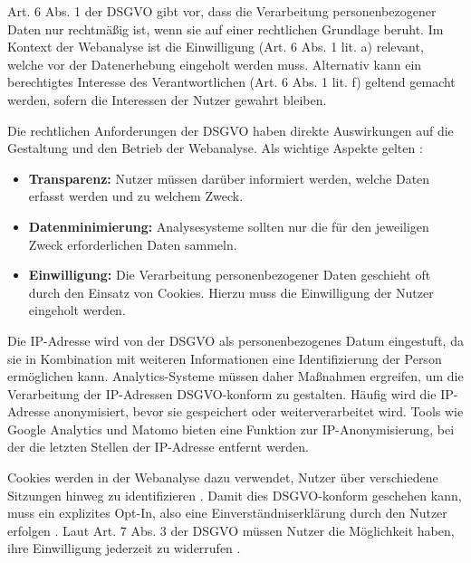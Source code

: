 Art. 6 Abs. 1 der DSGVO gibt vor, dass die Verarbeitung personenbezogener Daten nur rechtmäßig ist, wenn sie auf einer rechtlichen Grundlage beruht. Im Kontext der Webanalyse ist die Einwilligung (Art. 6 Abs. 1 lit. a) relevant, welche vor der Datenerhebung eingeholt werden muss. Alternativ kann ein berechtigtes Interesse des Verantwortlichen (Art. 6 Abs. 1 lit. f) geltend gemacht werden, sofern die Interessen der Nutzer gewahrt bleiben. \parencite{DSGVO}

Die rechtlichen Anforderungen der DSGVO haben direkte Auswirkungen auf die Gestaltung und den Betrieb der Webanalyse. Als wichtige Aspekte gelten \parencite[Kap.2.4]{Hanschke2020}:

\begin{itemize}
    \item \textbf{Transparenz:} Nutzer müssen darüber informiert werden, welche Daten erfasst werden und zu welchem Zweck.
    \item \textbf{Datenminimierung:} Analysesysteme sollten nur die für den jeweiligen Zweck erforderlichen Daten sammeln.
    \item \textbf{Einwilligung:} Die Verarbeitung personenbezogener Daten geschieht oft durch den Einsatz von Cookies. Hierzu muss die Einwilligung der Nutzer eingeholt werden. 
\end{itemize}

Die IP-Adresse wird von der DSGVO als personenbezogenes Datum eingestuft, da sie in Kombination mit weiteren Informationen eine Identifizierung der Person ermöglichen kann. Analytics-Systeme müssen daher Maßnahmen ergreifen, um die Verarbeitung der IP-Adressen DSGVO-konform zu gestalten. Häufig wird die IP-Adresse anonymisiert, bevor sie gespeichert oder weiterverarbeitet wird. Tools wie Google Analytics und Matomo bieten eine Funktion zur IP-Anonymisierung, bei der die letzten Stellen der IP-Adresse entfernt werden. \parencite{eRecht23} \parencite{MatomoGDPR} 

Cookies werden in der Webanalyse dazu verwendet, Nutzer über verschiedene Sitzungen hinweg zu identifizieren \parencite[Kap.2.2]{Hassler2019}. Damit dies DSGVO-konform geschehen kann, muss ein explizites Opt-In, also eine Einverständniserklärung durch den Nutzer erfolgen \parencite[Kap.2.4]{Hanschke2020}. Laut Art. 7 Abs. 3 der DSGVO müssen Nutzer die Möglichkeit haben, ihre Einwilligung jederzeit zu widerrufen \parencite{DSGVO}. 

